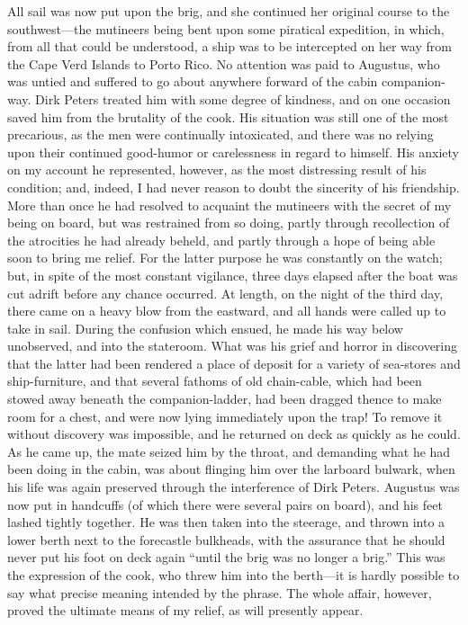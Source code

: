 All sail was now put upon the brig, and she continued her original course to
the southwest---the mutineers being bent upon some piratical expedition, in
which, from all that could be understood, a ship was to be intercepted on her
way from the Cape Verd Islands to Porto Rico. No attention was paid to Augustus,
who was untied and suffered to go about anywhere forward of the cabin
companion-way. Dirk Peters treated him with some degree of kindness, and on one
occasion saved him from the brutality of the cook. His situation was still one
of the most precarious, as the men were continually intoxicated, and there was
no relying upon their continued good-humor or carelessness in regard to himself.
His anxiety on my account he represented, however, as the most distressing
result of his condition; and, indeed, I had never reason to doubt the sincerity
of his friendship. More than once he had resolved to acquaint the mutineers with
the secret of my being on board, but was restrained from so doing, partly
through recollection of the atrocities he had already beheld, and partly through
a hope of being able soon to bring me relief. For the latter purpose he was
constantly on the watch; but, in spite of the most constant vigilance, three
days elapsed after the boat was cut adrift before any chance occurred. At
length, on the night of the third day, there came on a heavy blow from the
eastward, and all hands were called up to take in sail. During the confusion
which ensued, he made his way below unobserved, and into the stateroom. What was
his grief and horror in discovering that the latter had been rendered a place of
deposit for a variety of sea-stores and ship-furniture, and that several fathoms
of old chain-cable, which had been stowed away beneath the companion-ladder, had
been dragged thence to make room for a chest, and were now lying immediately
upon the trap! To remove it without discovery was impossible, and he returned on
deck as quickly as he could. As he came up, the mate seized him by the throat,
and demanding what he had been doing in the cabin, was about flinging him over
the larboard bulwark, when his life was again preserved through the interference
of Dirk Peters. Augustus was now put in handcuffs (of which there were several
pairs on board), and his feet lashed tightly together. He was then taken into
the steerage, and thrown into a lower berth next to the forecastle bulkheads,
with the assurance that he should never put his foot on deck again ``until the
brig was no longer a brig.'' This was the expression of the cook, who threw him
into the berth---it is hardly possible to say what precise meaning intended by
the phrase. The whole affair, however, proved the ultimate means of my relief,
as will presently appear. 

